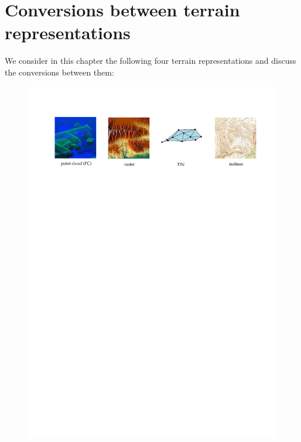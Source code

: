 

\graphicspath{{conversion/}}


\chapter{Conversions between terrain representations}%
\label{chap:conversion}

We consider in this chapter the following four terrain representations and discuss the conversions between them:
\begin{figure}[h]
  \includegraphics[width=\linewidth]{figs/reps}
\end{figure}


